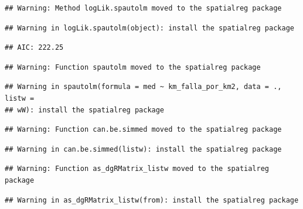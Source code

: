 \documentclass[11pt,]{article}
\newenvironment{Shaded}{\begin{snugshade}}{\end{snugshade}}
\newcommand{\KeywordTok}[1]{\textcolor[rgb]{0.13,0.29,0.53}{\textbf{#1}}}
\newcommand{\DataTypeTok}[1]{\textcolor[rgb]{0.13,0.29,0.53}{#1}}
\newcommand{\StringTok}[1]{\textcolor[rgb]{0.31,0.60,0.02}{#1}}
\newcommand{\OperatorTok}[1]{\textcolor[rgb]{0.81,0.36,0.00}{\textbf{#1}}}
\newcommand{\NormalTok}[1]{#1}
\begin{document}
\begin{verbatim}
## Warning: Method logLik.spautolm moved to the spatialreg package
\end{verbatim}

\begin{verbatim}
## Warning in logLik.spautolm(object): install the spatialreg package
\end{verbatim}

\begin{verbatim}
## AIC: 222.25
\end{verbatim}

\begin{Shaded}
\end{Shaded}

\begin{verbatim}
## Warning: Function spautolm moved to the spatialreg package
\end{verbatim}

\begin{verbatim}
## Warning in spautolm(formula = med ~ km_falla_por_km2, data = ., listw =
## wW): install the spatialreg package
\end{verbatim}

\begin{verbatim}
## Warning: Function can.be.simmed moved to the spatialreg package
\end{verbatim}

\begin{verbatim}
## Warning in can.be.simmed(listw): install the spatialreg package
\end{verbatim}

\begin{verbatim}
## Warning: Function as_dgRMatrix_listw moved to the spatialreg package
\end{verbatim}

\begin{verbatim}
## Warning in as_dgRMatrix_listw(from): install the spatialreg package
\end{verbatim}
\end{document}
